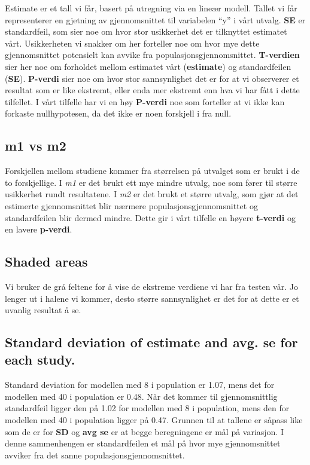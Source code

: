 \documentclass[
  letterpaper,
  DIV=11,
  numbers=noendperiod]{scrreprt}
\begin{document}
Estimate er et tall vi får, basert på utregning via en lineær modell.
Tallet vi får representerer en gjetning av gjennomsnittet til variabelen
``y'' i vårt utvalg. \textbf{SE} er standardfeil, som sier noe om hvor
stor usikkerhet det er tilknyttet estimatet vårt. Usikkerheten vi
snakker om her forteller noe om hvor mye dette gjennomsnittet potensielt
kan avvike fra populasjonsgjennomsnittet. \textbf{T-verdien} sier her
noe om forholdet mellom estimatet vårt (\textbf{estimate}) og
standardfeilen (\textbf{SE}). \textbf{P-verdi} sier noe om hvor stor
sannsynlighet det er for at vi observerer et resultat som er like
ekstremt, eller enda mer ekstremt enn hva vi har fått i dette tilfellet.
I vårt tilfelle har vi en høy \textbf{P-verdi} noe som forteller at vi
ikke kan forkaste nullhypotesen, da det ikke er noen forskjell i fra
null.

\subsection{m1 vs m2}\label{m1-vs-m2}

Forskjellen mellom studiene kommer fra størrelsen på utvalget som er
brukt i de to forskjellige. I \emph{m1} er det brukt ett mye mindre
utvalg, noe som fører til større usikkerhet rundt resultatene. I
\emph{m2} er det brukt et større utvalg, som gjør at det estimerte
gjennomsnittet blir nærmere populasjonsgjennomsnittet og standardfeilen
blir dermed mindre. Dette gir i vårt tilfelle en høyere \textbf{t-verdi}
og en lavere \textbf{p-verdi}.

\subsection{Shaded areas}\label{shaded-areas}

Vi bruker de grå feltene for å vise de ekstreme verdiene vi har fra
testen vår. Jo lenger ut i halene vi kommer, desto større sannsynlighet
er det for at dette er et uvanlig resultat å se.

\subsection{\texorpdfstring{Standard deviation of \textbf{estimate} and
avg. \textbf{se} for each
study.}{Standard deviation of estimate and avg. se for each study.}}\label{standard-deviation-of-estimate-and-avg.-se-for-each-study.}

Standard deviation for modellen med 8 i population er 1.07, mens det for
modellen med 40 i population er 0.48. Når det kommer til gjennomsnittlig
standardfeil ligger den på 1.02 for modellen med 8 i population, mens
den for modellen med 40 i population ligger på 0.47. Grunnen til at
tallene er såpass like som de er for \textbf{SD} og \textbf{avg se} er
at begge beregningene er mål på variasjon. I denne sammenhengen er
standardfeilen et mål på hvor mye gjennomsnittet avviker fra det sanne
populasjonsgjennomsnittet.
\end{document}
